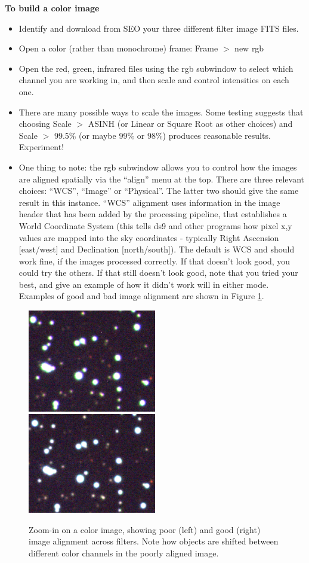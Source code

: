 \textbf{To build a color image}
\begin{itemize}
	\item Identify and download from SEO your three different filter image FITS files.
\item Open a color (rather than monochrome) frame:  Frame $>$ new rgb
\item Open the red, green, infrared files using the rgb subwindow to select which channel you are working in, and then scale and control intensities on each one. 
\item There are many possible ways to scale the images. Some testing suggests that choosing Scale $>$ ASINH (or Linear or Square Root as other choices) and Scale $>$ 99.5\% (or maybe 99\% or 98\%)  produces reasonable results. Experiment!
\item One thing to note: the rgb subwindow allows you to control how the images are aligned spatially via the “align” menu at the top. There are three relevant choices: “WCS”, “Image” or “Physical”.  The latter two should give the same result in this instance. “WCS” alignment uses information in the image header that has been added by the processing pipeline, that establishes a World Coordinate System (this tells ds9 and other programs how pixel x,y values are mapped into the sky coordinates - typically Right Ascension [east/west] and Declination [north/south]). The default is WCS and should work fine, if the images processed correctly. If that doesn’t look good, you could try the others. If that still doesn’t look good, note that you tried your best, and give an example of how it didn’t work will in either mode. Examples of good and bad image alignment are shown in Figure \ref{ic:fig:rgb-bad}.
\end{itemize}

\begin{figure}
	\includegraphics[width=0.5\textwidth]{inventing-color/rgb-bad}
	\includegraphics[width=0.5\textwidth]{inventing-color/rgb-good}
	\caption{Zoom-in on a color image, showing poor (left) and good (right) image alignment across filters. Note how objects are shifted between different color channels in the poorly aligned image.}\label{ic:fig:rgb-bad}
\end{figure}

